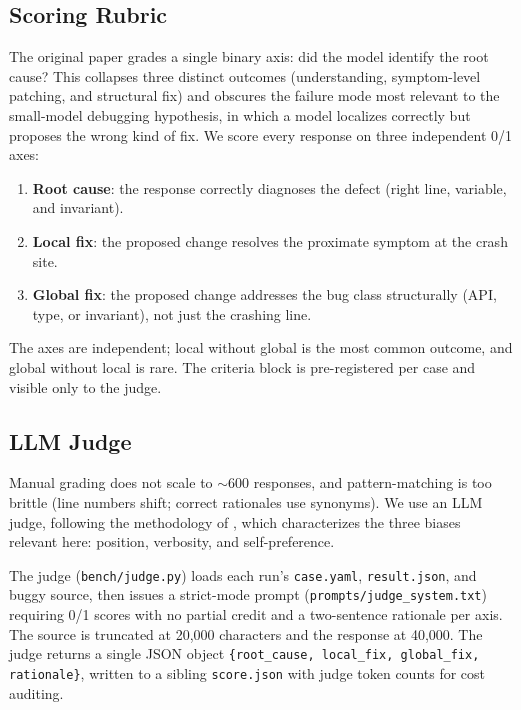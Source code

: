 \documentclass[11pt]{article}
\begin{document}
\subsection{Scoring Rubric}
\label{sec:methods:rubric}

The original paper grades a single binary axis: did the model identify the root cause? This collapses three distinct outcomes (understanding, symptom-level patching, and structural fix) and obscures the failure mode most relevant to the small-model debugging hypothesis, in which a model localizes correctly but proposes the wrong kind of fix. We score every response on three independent 0/1 axes:

\begin{enumerate}
    \item \textbf{Root cause}: the response correctly diagnoses the defect (right line, variable, and invariant).
    \item \textbf{Local fix}: the proposed change resolves the proximate symptom at the crash site.
    \item \textbf{Global fix}: the proposed change addresses the bug class structurally (API, type, or invariant), not just the crashing line.
\end{enumerate}

The axes are independent; local without global is the most common outcome, and global without local is rare. The criteria block is pre-registered per case and visible only to the judge.

\subsection{LLM Judge}
\label{sec:methods:judge}

Manual grading does not scale to $\sim$600 responses, and pattern-matching is too brittle (line numbers shift; correct rationales use synonyms). We use an LLM judge, following the methodology of \citet{zheng2023judging}, which characterizes the three biases relevant here: position, verbosity, and self-preference.

The judge (\texttt{bench/judge.py}) loads each run's \texttt{case.yaml}, \texttt{result.json}, and buggy source, then issues a strict-mode prompt (\texttt{prompts/judge\_system.txt}) requiring 0/1 scores with no partial credit and a two-sentence rationale per axis. The source is truncated at 20{,}000 characters and the response at 40{,}000. The judge returns a single JSON object \texttt{\{root\_cause, local\_fix, global\_fix, rationale\}}, written to a sibling \texttt{score.json} with judge token counts for cost auditing.
\end{document}
